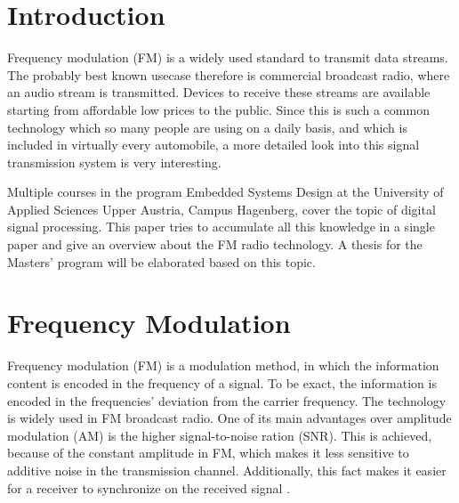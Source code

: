 \documentclass[conference]{IEEEtran}
\begin{document}
\section{Introduction}

  Frequency modulation (FM) is a widely used standard to transmit data streams.
  The probably best known usecase therefore is commercial broadcast radio, where an audio stream is transmitted.
  Devices to receive these streams are available starting from affordable low prices to the public.
  Since this is such a common technology which so many people are using on a daily basis, and which is included in virtually every automobile, a more detailed look into this signal transmission system is very interesting.

  Multiple courses in the program Embedded Systems Design at the University of Applied Sciences Upper Austria, Campus Hagenberg, cover the topic of digital signal processing.
  This paper tries to accumulate all this knowledge in a single paper and give an overview about the FM radio technology.
  A thesis for the Masters' program will be elaborated based on this topic.

%
%
%
%

  \section{Frequency Modulation}
    Frequency modulation (FM) is a modulation method, in which the information content is encoded in the frequency of a signal.
    To be exact, the information is encoded in the frequencies' deviation from the carrier frequency.
    The technology is widely used in FM broadcast radio.
    One of its main advantages over amplitude modulation (AM) is the higher signal-to-noise ration (SNR).
    This is achieved, because of the constant amplitude in FM, which makes it less sensitive to additive noise in the transmission channel.
    Additionally, this fact makes it easier for a receiver to synchronize on the received signal \cite{FM_Maths_Info_1}.
\end{document}
